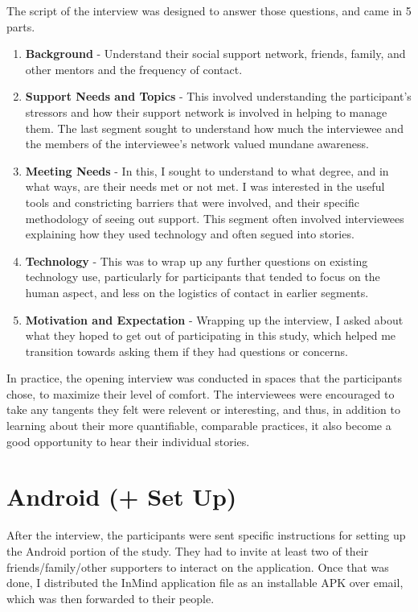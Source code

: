   The script of the interview was designed to answer those questions,
  and came in 5 parts.

  \begin{enumerate}
  \item \textbf{Background} -
    Understand their social support network,
    friends, family, and other mentors and the frequency of contact.
  \item \textbf{Support Needs and Topics} -
    This involved understanding the participant's stressors and how their
    support network is involved in helping to manage them.
    The last segment sought to understand how much the interviewee
    and the members of the interviewee's network valued
    mundane awareness.
  \item \textbf{Meeting Needs} -
    In this, I sought to understand to what degree,
    and in what ways, are their needs met or not met.
    I was interested in the useful tools and constricting barriers
    that were involved,
    and their specific methodology of seeing out support.
    This segment often involved interviewees explaining how they used technology
    and often segued into stories.
  \item \textbf{Technology} -
    This was to wrap up any further questions on existing technology use,
    particularly for participants that tended to focus on the human aspect,
    and less on the logistics of contact in earlier segments.
  \item \textbf{Motivation and Expectation} - 
    Wrapping up the interview, I asked about what they hoped
		to get out of participating in this study,
    which helped me transition towards asking them if they had questions
    or concerns.
  \end{enumerate}

  In practice, the opening interview was conducted in spaces
  that the participants chose, to maximize their level of comfort.
  The interviewees were encouraged to take any tangents they felt
  were relevent or interesting, and thus,
  in addition to learning about their more quantifiable, comparable practices,
  it also become a good opportunity to hear their individual stories.

\section{Android (+ Set Up)}
  After the interview, the participants were sent specific instructions
  for setting up the Android portion of the study.
  They had to invite at least two of their friends/family/other supporters
  to interact on the application.
  Once that was done, I distributed the InMind application file as
  an installable APK over email, which was then forwarded to their people.

